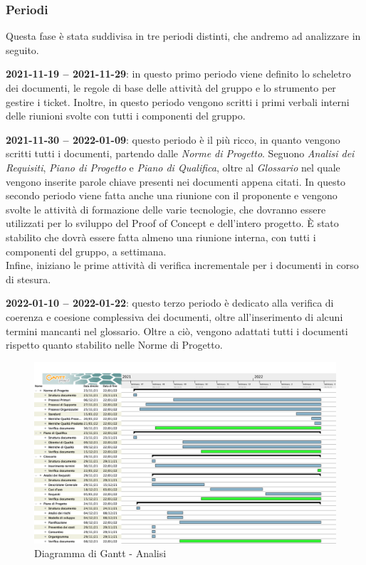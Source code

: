 \subsubsection{Periodi}

Questa fase è stata suddivisa in tre periodi distinti, che andremo ad analizzare in seguito.


\textbf{2021-11-19 – 2021-11-29}: in questo primo periodo viene definito lo scheletro dei documenti, le regole di base delle attività del gruppo e lo strumento per gestire i ticket. Inoltre, in questo periodo vengono scritti i primi verbali interni delle riunioni svolte con tutti i componenti del gruppo.


\textbf{2021-11-30 – 2022-01-09}: questo periodo è il più ricco, in quanto vengono scritti tutti i documenti, partendo dalle \textit{Norme di Progetto}. Seguono \textit{Analisi dei Requisiti}, \textit{Piano di Progetto} e \textit{Piano di Qualifica}, oltre al \textit{Glossario} nel quale vengono inserite parole chiave presenti nei documenti appena citati. In questo secondo periodo viene fatta anche una riunione con il proponente e vengono svolte le attività di formazione delle varie tecnologie, che dovranno essere utilizzati per lo sviluppo del Proof of Concept e dell’intero progetto. È stato stabilito che dovrà essere fatta almeno una riunione interna, con tutti i componenti del gruppo, a settimana. \\
Infine, iniziano le prime attività di verifica incrementale per i documenti in corso di stesura. 


\textbf{2022-01-10 – 2022-01-22}: questo terzo periodo è dedicato alla verifica di coerenza e coesione complessiva dei documenti, oltre all’inserimento di alcuni termini mancanti nel glossario. Oltre a ciò, vengono adattati tutti i documenti rispetto quanto stabilito nelle Norme di Progetto.

\begin{figure}[H]
\centering
\includegraphics[scale=0.35]{Sezioni/gantt/Analisi.png}
\caption{Diagramma di Gantt - Analisi}
\end{figure}
